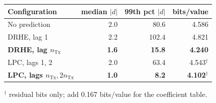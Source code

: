 \documentclass[10pt,a4paper]{article}
\newcommand{\tno}[1]{\textbf{#1}}
\begin{document}
\begin{center}
\begin{minipage}{0.98\textwidth}\centering
{}
\centering\small
\begin{tabular}{@{}lrrr@{}}
\toprule
Configuration & median $|d|$ & 99th pct $|d|$ & bits/value\\
\midrule
No prediction                        & 2.0 & 80.6  & 4.586\\
DRHE, lag 1                          & 2.2 & \textcolor{warm}{102.4} & 4.821\\
\tno{DRHE, lag $n_{\mathrm{Tx}}$}    & \tno{1.6} & \tno{15.8}  & \tno{4.240}\\
LPC, lags 1, 2                       & 2.0 & 63.4  & 4.543$^\dagger$\\
\tno{LPC, lags $n_{\mathrm{Tx}}, 2n_{\mathrm{Tx}}$} & \tno{1.0} & \tno{8.2} & \tno{4.102}$^\dagger$\\
\bottomrule
\end{tabular}
\par\vspace{2pt}\footnotesize
$^\dagger$ residual bits only; add \num{0.167} bits/value for the coefficient table.
\end{minipage}
\end{center}
\end{document}
